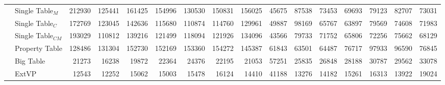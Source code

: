 \documentclass[
  a4paper,
  12pt,
  oneside,
  parskip=half,
  headsepline,
]{scrartcl}
\begin{document}
\begin{table*}[htb]
\begin{tabular*}{\textwidth}{ ll @{\extracolsep{\fill}} rrrrrrrrrrrrrr }
		& Single Table$_M$ & 212930 & 125441 & 161425 & 154996 & 130530 & 150831 & 156025 & 45675 & 87538 & 73453 & 69693 & 79123 & 82707 & 73031 \\
		& Single Table$_C$ & 172769 & 123045 & 142636 & 115680 & 110874 & 114760 & 129961 & 49887 & 98169 & 65767 & 63897 & 79569 & 74608 & 71983 \\
		& Single Table$_{CM}$ & 193029 & 110812 & 139216 & 121499 & 118094 & 121926 & 134096 & 43566 & 79733 & 71752 & 65806 & 72256 & 75662 & 68129 \\
		& Property Table & 128486 & 131304 & 152730 & 152169 & 153360 & 154272 & 145387 & 61843 & 63501 & 64487 & 76717 & 97933 & 96590 & 76845 \\
		& Big Table & 21273 & 16238 & 19872 & 22364 & 24376 & 22195 & 21053 & 57251 & 25835 & 26848 & 28188 & 30787 & 29562 & 33078 \\
		& ExtVP & 12543 & 12252 & 15062 & 15003 & 15478 & 16124 & 14410 & 41188 & 13276 & 14182 & 15261 & 16313 & 13922 & 19024
  	\end{tabular*}


\end{table*}
\end{document}

